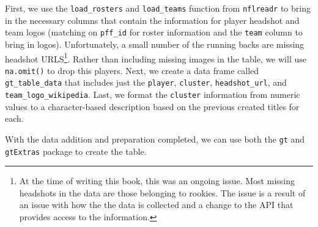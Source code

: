 \documentclass[
  letterpaper,
]{krantz}
\begin{document}
First, we use the \texttt{load\_rosters} and \texttt{load\_teams}
function from \texttt{nflreadr} to bring in the necessary columns that
contain the information for player headshot and team logos (matching on
\texttt{pff\_id} for roster information and the \texttt{team} column to
bring in logos). Unfortunately, a small number of the running backs are
missing headshot URLS\footnote{At the time of writing this book, this
  was an ongoing issue. Most missing headshots in the data are those
  belonging to rookies. The issue is a result of an issue with how the
  the data is collected and a change to the API that provides access to
  the information.}. Rather than including missing images in the table,
we will use \texttt{na.omit()} to drop this players. Next, we create a
data frame called \texttt{gt\_table\_data} that includes just the
\texttt{player}, \texttt{cluster}, \texttt{headshot\_url}, and
\texttt{team\_logo\_wikipedia}. Last, we format the \texttt{cluster}
information from numeric values to a character-based description based
on the previous created titles for each.

With the data addition and preparation completed, we can use both the
\texttt{gt} and \texttt{gtExtras} package to create the table.
\end{document}
